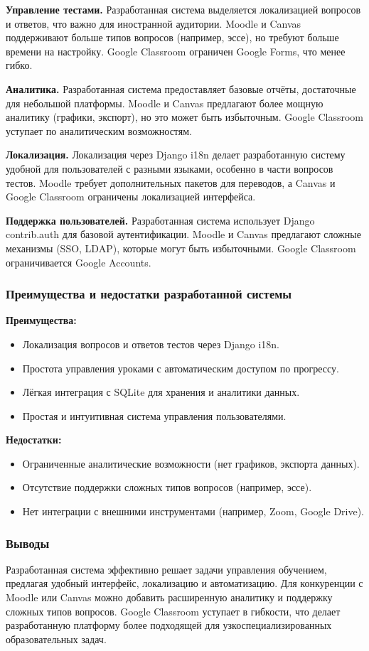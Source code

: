 \textbf{Управление тестами.} Разработанная система выделяется локализацией вопросов и ответов, что важно для иностранной аудитории. Moodle и Canvas поддерживают больше типов вопросов (например, эссе), но требуют больше времени на настройку. Google Classroom ограничен Google Forms, что менее гибко.

\textbf{Аналитика.} Разработанная система предоставляет базовые отчёты, достаточные для небольшой платформы. Moodle и Canvas предлагают более мощную аналитику (графики, экспорт), но это может быть избыточным. Google Classroom уступает по аналитическим возможностям.

\textbf{Локализация.} Локализация через Django i18n делает разработанную систему удобной для пользователей с разными языками, особенно в части вопросов тестов. Moodle требует дополнительных пакетов для переводов, а Canvas и Google Classroom ограничены локализацией интерфейса.

\textbf{Поддержка пользователей.} Разработанная система использует Django contrib.auth для базовой аутентификации. Moodle и Canvas предлагают сложные механизмы (SSO, LDAP), которые могут быть избыточными. Google Classroom ограничивается Google Accounts.

\subsubsection{Преимущества и недостатки разработанной системы}

\textbf{Преимущества:}
\begin{itemize}
	\item Локализация вопросов и ответов тестов через Django i18n.
	\item Простота управления уроками с автоматическим доступом по прогрессу.
	\item Лёгкая интеграция с SQLite для хранения и аналитики данных.
	\item Простая и интуитивная система управления пользователями.
\end{itemize}

\textbf{Недостатки:}
\begin{itemize}
	\item Ограниченные аналитические возможности (нет графиков, экспорта данных).
	\item Отсутствие поддержки сложных типов вопросов (например, эссе).
	\item Нет интеграции с внешними инструментами (например, Zoom, Google Drive).
\end{itemize}

\subsubsection{Выводы}

Разработанная система эффективно решает задачи управления обучением, предлагая удобный интерфейс, локализацию и автоматизацию. Для конкуренции с Moodle или Canvas можно добавить расширенную аналитику и поддержку сложных типов вопросов. Google Classroom уступает в гибкости, что делает разработанную платформу более подходящей для узкоспециализированных образовательных задач.




